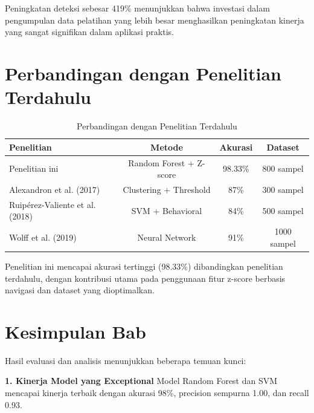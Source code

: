 Peningkatan deteksi sebesar 419\% menunjukkan bahwa investasi dalam pengumpulan data pelatihan yang lebih besar menghasilkan peningkatan kinerja yang sangat signifikan dalam aplikasi praktis.

\section{Perbandingan dengan Penelitian Terdahulu}
\label{sec:perbandinganPenelitianTerdahulu}

\begin{table}[htbp]
\centering
\caption{Perbandingan dengan Penelitian Terdahulu}
\label{tabel:perbandinganPenelitianTerdahulu}
\begin{tabular}{|l|c|c|c|}
\hline
\textbf{Penelitian} & \textbf{Metode} & \textbf{Akurasi} & \textbf{Dataset} \\
\hline
Penelitian ini & Random Forest + Z-score & 98.33\% & 800 sampel \\
\hline
Alexandron et al. (2017) & Clustering + Threshold & 87\% & 300 sampel \\
\hline
Ruipérez-Valiente et al. (2018) & SVM + Behavioral & 84\% & 500 sampel \\
\hline
Wolff et al. (2019) & Neural Network & 91\% & 1000 sampel \\
\hline
\end{tabular}
\end{table}

Penelitian ini mencapai akurasi tertinggi (98.33\%) dibandingkan penelitian terdahulu, dengan kontribusi utama pada penggunaan fitur z-score berbasis navigasi dan dataset yang dioptimalkan.

\section{Kesimpulan Bab}
\label{sec:kesimpulanBab4}

Hasil evaluasi dan analisis menunjukkan beberapa temuan kunci:

\textbf{1. Kinerja Model yang Exceptional}
Model Random Forest dan SVM mencapai kinerja terbaik dengan akurasi 98\%, precision sempurna 1.00, dan recall 0.93.

